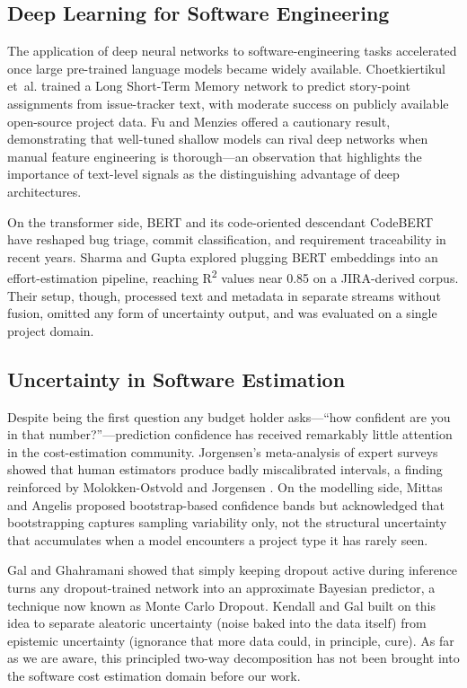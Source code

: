\documentclass[conference]{IEEEtran}
\begin{document}
\subsection{Deep Learning for Software Engineering}

The application of deep neural networks to software-engineering tasks accelerated once large pre-trained language models became widely available. Choetkiertikul et~al. \cite{choetkiertikul2019} trained a Long Short-Term Memory network to predict story-point assignments from issue-tracker text, with moderate success on publicly available open-source project data. Fu and Menzies \cite{fu2017} offered a cautionary result, demonstrating that well-tuned shallow models can rival deep networks when manual feature engineering is thorough---an observation that highlights the importance of text-level signals as the distinguishing advantage of deep architectures.

On the transformer side, BERT \cite{devlin2019} and its code-oriented descendant CodeBERT \cite{feng2020} have reshaped bug triage, commit classification, and requirement traceability in recent years. Sharma and Gupta \cite{sharma2022} explored plugging BERT embeddings into an effort-estimation pipeline, reaching R\textsuperscript{2} values near 0.85 on a JIRA-derived corpus. Their setup, though, processed text and metadata in separate streams without fusion, omitted any form of uncertainty output, and was evaluated on a single project domain.

\subsection{Uncertainty in Software Estimation}

Despite being the first question any budget holder asks---``how confident are you in that number?''---prediction confidence has received remarkably little attention in the cost-estimation community. Jorgensen's meta-analysis of expert surveys \cite{jorgensen2004} showed that human estimators produce badly miscalibrated intervals, a finding reinforced by Molokken-Ostvold and Jorgensen \cite{molokken2003}. On the modelling side, Mittas and Angelis \cite{mittas2013} proposed bootstrap-based confidence bands but acknowledged that bootstrapping captures sampling variability only, not the structural uncertainty that accumulates when a model encounters a project type it has rarely seen.

Gal and Ghahramani \cite{gal2016} showed that simply keeping dropout active during inference turns any dropout-trained network into an approximate Bayesian predictor, a technique now known as Monte Carlo Dropout. Kendall and Gal \cite{kendall2017} built on this idea to separate aleatoric uncertainty (noise baked into the data itself) from epistemic uncertainty (ignorance that more data could, in principle, cure). As far as we are aware, this principled two-way decomposition has not been brought into the software cost estimation domain before our work.
\end{document}
